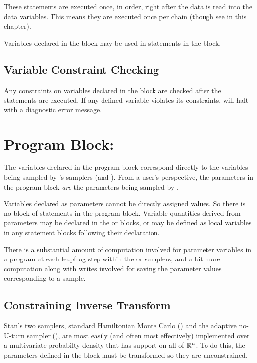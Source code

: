 These statements are executed once, in order, right after the data is
read into the data variables.  This means they are executed once per
chain (though see  in this chapter).

Variables declared in the  block may be used in statements
in the  block.

\subsection{Variable Constraint Checking}

Any constraints on variables declared in the 
block are checked after the statements are executed.  If any defined
variable violates its constraints, \Stan will halt with a diagnostic
error message.


\section{Program Block: }

The variables declared in the  program block
correspond directly to the variables being sampled by \Stan's samplers
(\HMC and \NUTS).  From a user's perspective, the parameters in the
program block \emph{are} the parameters being sampled by \Stan.  

Variables declared as parameters cannot be directly assigned values.
So there is no block of statements in the  program
block.  Variable quantities derived from parameters may be declared in
the  or  blocks,
or may be defined as local variables in any statement blocks following
their declaration.

There is a substantial amount of computation involved for parameter
variables in a \Stan program at each leapfrog step within the
\HMC or \NUTS samplers, and a bit more computation along with writes
involved for saving the parameter values corresponding to a sample.

\subsection{Constraining Inverse Transform}

Stan's two samplers, standard Hamiltonian Monte Carlo (\HMC) and the
adaptive no-U-turn sampler (\NUTS), are most easily (and often most
effectively) implemented over a multivariate probabilty density that
has support on all of $\mathbb{R}^n$.  To do this, the parameters
defined in the  block must be transformed so they are
unconstrained. 

